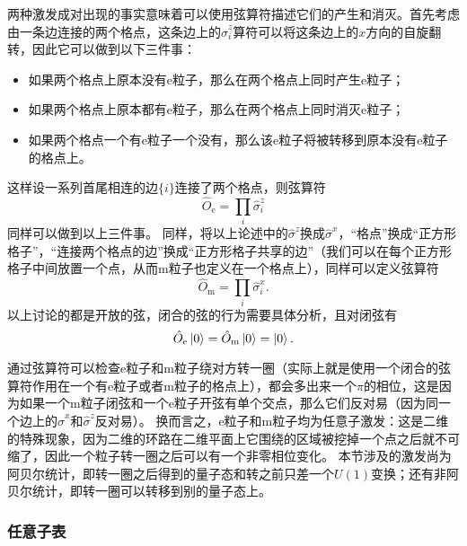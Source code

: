 \documentclass[hyperref, UTF8, a4paper]{ctexart}
\begin{document}
两种激发成对出现的事实意味着可以使用弦算符描述它们的产生和消灭。首先考虑由一条边连接的两个格点，这条边上的$\hat{\sigma}^z_i$算符可以将这条边上的$x$方向的自旋翻转，因此它可以做到以下三件事：
\begin{itemize}
    \item 如果两个格点上原本没有e粒子，那么在两个格点上同时产生e粒子；
    \item 如果两个格点上原本都有e粒子，那么在两个格点上同时消灭e粒子； 
    \item 如果两个格点一个有e粒子一个没有，那么该e粒子将被转移到原本没有e粒子的格点上。
\end{itemize}
这样设一系列首尾相连的边$\{i\}$连接了两个格点，则弦算符
\begin{equation}
    \hat{O}_\text{e} = \prod_{i} \hat{\sigma}_i^z
\end{equation}
同样可以做到以上三件事。
同样，将以上论述中的$\hat{\sigma}^z$换成$\hat{\sigma}^x$，“格点”换成“正方形格子”，“连接两个格点的边”换成“正方形格子共享的边”（我们可以在每个正方形格子中间放置一个点，从而m粒子也定义在一个格点上），同样可以定义弦算符
\begin{equation}
    \hat{O}_\text{m} = \prod_{i} \hat{\sigma}_i^x.
\end{equation}
以上讨论的都是开放的弦，闭合的弦的行为需要具体分析，且对闭弦有
\begin{equation}
    \hat{O}_\text{e} \ket{0} = \hat{O}_\text{m} \ket{0} = \ket{0}.
\end{equation}

通过弦算符可以检查e粒子和m粒子绕对方转一圈（实际上就是使用一个闭合的弦算符作用在一个有e粒子或者m粒子的格点上），都会多出来一个$\pi$的相位，这是因为如果一个m粒子闭弦和一个e粒子开弦有单个交点，那么它们反对易（因为同一个边上的$\hat{\sigma}^x$和$\hat{\sigma}^z$反对易）。
换而言之，e粒子和m粒子均为任意子激发：这是二维的特殊现象，因为二维的环路在二维平面上它围绕的区域被挖掉一个点之后就不可缩了，因此一个粒子转一圈之后可以有一个非零相位变化。
本节涉及的激发尚为阿贝尔统计，即转一圈之后得到的量子态和转之前只差一个$U(1)$变换；还有非阿贝尔统计，即转一圈可以转移到别的量子态上。

\subsubsection{任意子表}
\end{document}

